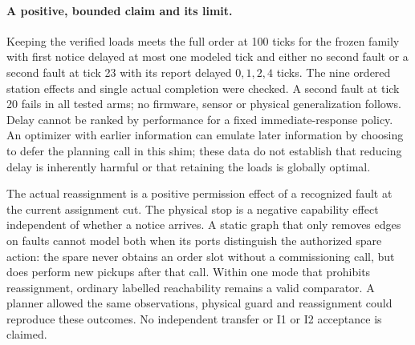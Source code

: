 \documentclass[11pt]{article}
\begin{document}
\paragraph{A positive, bounded claim and its limit.}
Keeping the verified loads meets the full order at 100 ticks for the frozen family with first notice delayed at most one modeled tick and either no second fault or a second fault at tick 23 with its report delayed $0,1,2,4$ ticks. The nine ordered station effects and single actual completion were checked. A second fault at tick 20 fails in all tested arms; no firmware, sensor or physical generalization follows. Delay cannot be ranked by performance for a fixed immediate-response policy. An optimizer with earlier information can emulate later information by choosing to defer the planning call in this shim; these data do not establish that reducing delay is inherently harmful or that retaining the loads is globally optimal.

The actual reassignment is a positive permission effect of a recognized fault at the current assignment cut. The physical stop is a negative capability effect independent of whether a notice arrives. A static graph that only removes edges on faults cannot model both when its ports distinguish the authorized spare action: the spare never obtains an order slot without a commissioning call, but does perform new pickups after that call. Within one mode that prohibits reassignment, ordinary labelled reachability remains a valid comparator. A planner allowed the same observations, physical guard and reassignment could reproduce these outcomes. No independent transfer or I1 or I2 acceptance is claimed.
\end{document}
